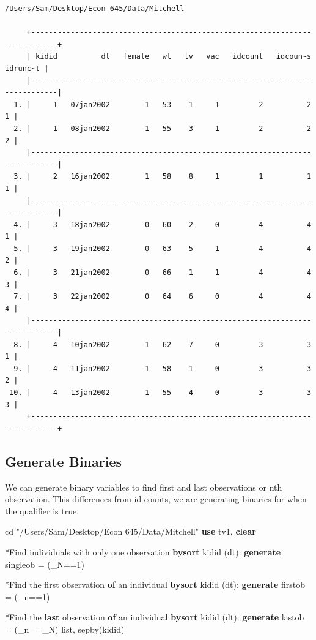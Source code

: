 \documentclass[
]{book}
\newenvironment{Shaded}{\begin{snugshade}}{\end{snugshade}}
\newcommand{\DataTypeTok}[1]{\textcolor[rgb]{0.13,0.29,0.53}{#1}}
\newcommand{\FunctionTok}[1]{\textcolor[rgb]{0.13,0.29,0.53}{\textbf{#1}}}
\newcommand{\KeywordTok}[1]{\textcolor[rgb]{0.13,0.29,0.53}{\textbf{#1}}}
\newcommand{\NormalTok}[1]{#1}
\newcommand{\OtherTok}[1]{\textcolor[rgb]{0.56,0.35,0.01}{#1}}
\newcommand{\StringTok}[1]{\textcolor[rgb]{0.31,0.60,0.02}{#1}}
\begin{document}
\begin{verbatim}
/Users/Sam/Desktop/Econ 645/Data/Mitchell

     +----------------------------------------------------------------------------+
     | kidid          dt   female   wt   tv   vac   idcount   idcoun~s   idrunc~t |
     |----------------------------------------------------------------------------|
  1. |     1   07jan2002        1   53    1     1         2          2          1 |
  2. |     1   08jan2002        1   55    3     1         2          2          2 |
     |----------------------------------------------------------------------------|
  3. |     2   16jan2002        1   58    8     1         1          1          1 |
     |----------------------------------------------------------------------------|
  4. |     3   18jan2002        0   60    2     0         4          4          1 |
  5. |     3   19jan2002        0   63    5     1         4          4          2 |
  6. |     3   21jan2002        0   66    1     1         4          4          3 |
  7. |     3   22jan2002        0   64    6     0         4          4          4 |
     |----------------------------------------------------------------------------|
  8. |     4   10jan2002        1   62    7     0         3          3          1 |
  9. |     4   11jan2002        1   58    1     0         3          3          2 |
 10. |     4   13jan2002        1   55    4     0         3          3          3 |
     +----------------------------------------------------------------------------+
\end{verbatim}

\subsection*{Generate Binaries}\label{generate-binaries}

We can generate binary variables to find first and last observations or nth
observation. This differences from id counts, we are generating binaries for
when the qualifier is true.

\begin{Shaded}
\begin{Highlighting}[]
\NormalTok{cd }\StringTok{"/Users/Sam/Desktop/Econ 645/Data/Mitchell"}
\KeywordTok{use}\NormalTok{ tv1, }\KeywordTok{clear}

\NormalTok{*Find individuals with only one observation}
\KeywordTok{bysort}\NormalTok{ kidid (dt): }\KeywordTok{generate}\NormalTok{ singleob = (\_N==1)}

\NormalTok{*Find the first observation }\KeywordTok{of}\NormalTok{ an individual}
\KeywordTok{bysort}\NormalTok{ kidid (dt): }\KeywordTok{generate}\NormalTok{ firstob = (}\DataTypeTok{\_n}\NormalTok{==1)}

\NormalTok{*Find the }\FunctionTok{last}\NormalTok{ observation }\KeywordTok{of}\NormalTok{ an individual }
\KeywordTok{bysort}\NormalTok{ kidid (dt): }\KeywordTok{generate}\NormalTok{ lastob = (}\DataTypeTok{\_n}\NormalTok{==\_N)}
\OtherTok{list}\NormalTok{, sepby(kidid)}
\end{Highlighting}
\end{Shaded}
\end{document}
